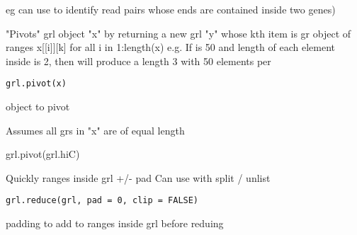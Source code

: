 \documentclass[a4paper]{book}
\begin{document}
%
\begin{Details}\relax
eg can use to identify read pairs whose ends are contained inside two genes)
\end{Details}
%
\begin{Description}\relax
"Pivots" grl object "x" by returning a new grl "y" whose
kth item is gr object of ranges x[[i]][k] for all i in 1:length(x)
e.g. If  is 50 and length of each  element inside is 2, then 
will produce a length 3  with 50 elements per 
\end{Description}
%
\begin{Usage}
\begin{verbatim}
grl.pivot(x)
\end{verbatim}
\end{Usage}
%
\begin{Arguments}
\begin{ldescription}
\item[\code{x}]  object to pivot
\end{ldescription}
\end{Arguments}
%
\begin{Details}\relax
Assumes all grs in "x" are of equal length
\end{Details}
%
\begin{Examples}
\begin{ExampleCode}
grl.pivot(grl.hiC)
\end{ExampleCode}
\end{Examples}
%
\begin{Description}\relax
Quickly ranges inside grl +/- pad
Can use with split / unlist
\end{Description}
%
\begin{Usage}
\begin{verbatim}
grl.reduce(grl, pad = 0, clip = FALSE)
\end{verbatim}
\end{Usage}
%
\begin{Arguments}
\begin{ldescription}
\item[\code{grl}] 

\item[\code{pad}] padding to add to ranges inside grl before reduing
\end{ldescription}
\end{Arguments}
\end{document}
